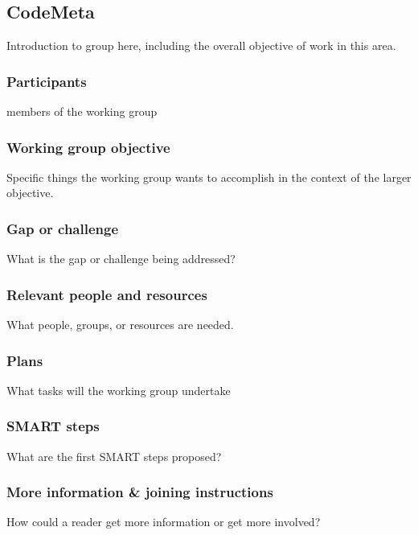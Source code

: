 \subsection{CodeMeta}
\label{sec:CodeMeta}


Introduction to group here, including the overall objective of work in this area.

\subsubsection{Participants}

members of the working group

\subsubsection{Working group objective}

Specific things the working group wants to accomplish in the context of the larger objective.

\subsubsection{Gap or challenge}

What is the gap or challenge being addressed?

\subsubsection{Relevant people and resources}

What people, groups, or resources are needed.

\subsubsection{Plans}

What tasks will the working group undertake

\subsubsection{SMART steps}

What are the first SMART steps proposed?

\subsubsection{More information \& joining instructions}

How could a reader get more information or get more involved?